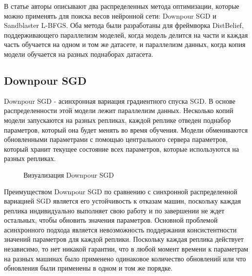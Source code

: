 \indent\setlength{\parindent}{1em} 
В статье авторы описывают два распределенных метода оптимизации, которые можно применять для поиска весов нейронной сети: Downpour SGD и Sandblaster L-BFGS. Оба метода были разработаны для фреймворка DistBelief, поддерживающего параллелизм моделей, когда модель делится на части и каждая часть обучается на одном и том же датасете, и параллелизм данных, когда копия модели обучается на разных поднаборах датасета. 

\subsection{Downpour SGD}
\indent\setlength{\parindent}{1em} 
Downpour SGD - асинхронная вариация градиентного спуска SGD. В основе распределенности этой модели лежит параллелизм данных. Несколько копий модели запускаются на разных репликах, каждой реплике отведен поднабор параметров, который она будет менять во время обучения. Модели обмениваются обновленными параметрами с помощью центрального сервера параметров, который хранит текущее состояние всех параметров, которые используются на разных репликах.
\begin{figure}[h]%
	\centering
	\caption{Визуализация Downpour SGD}
	\label{framework} %
\end{figure}

\indent\setlength{\parindent}{1em} 
Преимуществом Downpour SGD по сравнению с синхронной распределенной вариацией SGD является его устойчивость к отказам машин, поскольку каждая реплика индивидуально выполняет свою работу и по завершении не ждет остальных, чтобы обновить значения параметров. Основной проблемой асинхронного подхода является невозможность поддержания консистентности значений параметров для каждой реплики. Поскольку каждая реплика действует независимо, то нет никакой гарантии, что в любой момент времени к параметрам на разных машинах было применено одинаковое количество обновлений или что обновления были применены в одном и том же порядке.

